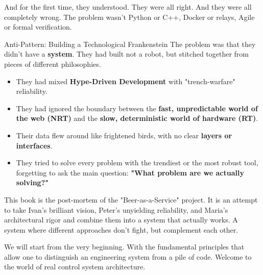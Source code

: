And for the first time, they understood. They were all right. And they were all completely wrong. The problem wasn't Python or C++, Docker or relays, Agile or formal verification.

\begin{dangerbox}{Anti-Pattern: Building a Technological Frankenstein} %
The problem was that they didn't have a \textbf{system}. They had built not a robot, but stitched together from pieces of different philosophies.
\begin{itemize}
    \item They had mixed \textbf{Hype-Driven Development} with "trench-warfare" reliability.
    \item They had ignored the boundary between the \textbf{fast, unpredictable world of the web (NRT)} and the \textbf{slow, deterministic world of hardware (RT)}.
    \item Their data flew around like frightened birds, with no clear \textbf{layers or interfaces}.
    \item They tried to solve every problem with the trendiest or the most robust tool, forgetting to ask the main question: \textbf{"What problem are we actually solving?"}
\end{itemize}
\end{dangerbox}

This book is the post-mortem of the "Beer-as-a-Service" project. It is an attempt to take Ivan's brilliant vision, Peter's unyielding reliability, and Maria's architectural rigor and combine them into a system that actually works. A system where different approaches don't fight, but complement each other.

We will start from the very beginning. With the fundamental principles that allow one to distinguish an engineering system from a pile of code. Welcome to the world of real control system architecture.